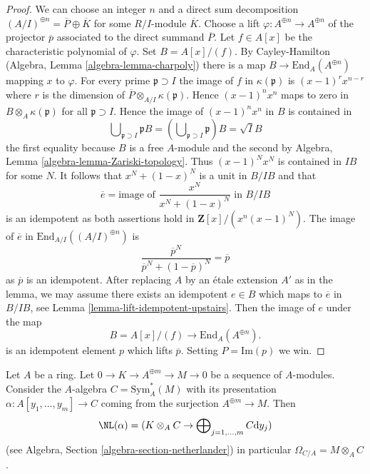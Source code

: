 \begin{proof}
We can choose an integer $n$ and a direct sum decomposition
$(A/I)^{\oplus n} = \overline{P} \oplus \overline{K}$
for some $R/I$-module $\overline{K}$. Choose a lift
$\varphi : A^{\oplus n} \to A^{\oplus n}$ of the projector $\overline{p}$
associated to the direct summand $\overline{P}$.
Let $f \in A[x]$ be the characteristic polynomial of $\varphi$.
Set $B = A[x]/(f)$. By Cayley-Hamilton
(Algebra, Lemma \ref{algebra-lemma-charpoly}) there is a map
$B \to \text{End}_A(A^{\oplus n})$ mapping $x$ to $\varphi$.
For every prime $\mathfrak p \supset I$ the image of $f$ in
$\kappa(\mathfrak p)$ is $(x - 1)^rx^{n - r}$ where $r$ is the
dimension of $\overline{P} \otimes_{A/I} \kappa(\mathfrak p)$.
Hence $(x - 1)^nx^n$ maps to zero in $B \otimes_A \kappa(\mathfrak p)$
for all $\mathfrak p \supset I$. Hence the image of $(x - 1)^nx^n$
in $B$ is contained in
$$
\bigcup\nolimits_{\mathfrak p \supset I} \mathfrak pB =
(\bigcup\nolimits_{\mathfrak p \supset I} \mathfrak p)B =
\sqrt{I} B
$$
the first equality because $B$ is a free $A$-module and the second
by Algebra, Lemma \ref{algebra-lemma-Zariski-topology}.
Thus $(x - 1)^N x^N$ is contained in $IB$ for some $N$.
It follows that $x^N + (1 - x)^N$ is a unit in $B/IB$ and that
$$
\overline{e} = \text{image of }\frac{x^N}{x^N + (1 - x)^N}\text{ in }B/IB
$$
is an idempotent as both assertions hold in $\mathbf{Z}[x]/(x^n(x - 1)^N)$.
The image of $\overline{e}$ in $\text{End}_{A/I}((A/I)^{\oplus n})$ is
$$
\frac{\overline{p}^N}{\overline{p}^N + (1 - \overline{p})^N} = \overline{p}
$$
as $\overline{p}$ is an idempotent. After replacing $A$ by an \'etale
extension $A'$ as in the lemma, we may assume there exists an idempotent
$e \in B$ which maps to $\overline{e}$ in $B/IB$, see
Lemma \ref{lemma-lift-idempotent-upstairs}.
Then the image of $e$ under the map
$$
B = A[x]/(f) \longrightarrow \text{End}_A(A^{\oplus n}).
$$
is an idempotent element $p$ which lifts $\overline{p}$.
Setting $P = \text{Im}(p)$ we win.
\end{proof}

\begin{lemma}
\label{lemma-cotangent-complex-symmetric-algebra}
Let $A$ be a ring. Let $0 \to K \to A^{\oplus m} \to M \to 0$
be a sequence of $A$-modules. Consider the $A$-algebra
$C = \text{Sym}^*_A(M)$ with its presentation
$\alpha : A[y_1, \ldots, y_m] \to C$
coming from the surjection $A^{\oplus m} \to M$. Then
$$
\NL(\alpha) =
(K \otimes_A C \to \bigoplus\nolimits_{j = 1, \ldots, m} C \text{d}y_j)
$$
(see Algebra, Section \ref{algebra-section-netherlander})
in particular $\Omega_{C/A} = M \otimes_A C$.
\end{lemma}


